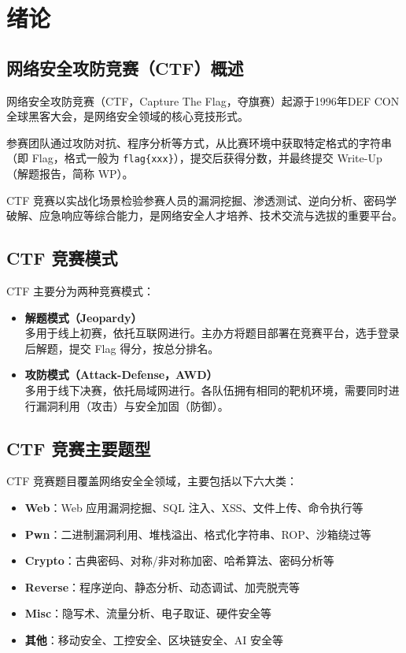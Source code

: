 \section{绪论}
\label{sec:introduction}

\subsection{网络安全攻防竞赛（CTF）概述}
网络安全攻防竞赛（CTF，Capture The Flag，夺旗赛）起源于1996年DEF CON全球黑客大会，是网络安全领域的核心竞技形式。

参赛团队通过攻防对抗、程序分析等方式，从比赛环境中获取特定格式的字符串（即 Flag，格式一般为 \verb|flag{xxx}|），提交后获得分数，并最终提交 Write-Up（解题报告，简称 WP）。

CTF 竞赛以实战化场景检验参赛人员的漏洞挖掘、渗透测试、逆向分析、密码学破解、应急响应等综合能力，是网络安全人才培养、技术交流与选拔的重要平台。

\subsection{CTF 竞赛模式}
CTF 主要分为两种竞赛模式：
\begin{itemize}[leftmargin=*]
    \item \textbf{解题模式（Jeopardy）}
    \\多用于线上初赛，依托互联网进行。主办方将题目部署在竞赛平台，选手登录后解题，提交 Flag 得分，按总分排名。

    \item \textbf{攻防模式（Attack-Defense，AWD）}
    \\多用于线下决赛，依托局域网进行。各队伍拥有相同的靶机环境，需要同时进行漏洞利用（攻击）与安全加固（防御）。
\end{itemize}

\subsection{CTF 竞赛主要题型}
CTF 竞赛题目覆盖网络安全全领域，主要包括以下六大类：
\begin{itemize}[leftmargin=*]
    \item \textbf{Web}：Web 应用漏洞挖掘、SQL 注入、XSS、文件上传、命令执行等
    \item \textbf{Pwn}：二进制漏洞利用、堆栈溢出、格式化字符串、ROP、沙箱绕过等
    \item \textbf{Crypto}：古典密码、对称/非对称加密、哈希算法、密码分析等
    \item \textbf{Reverse}：程序逆向、静态分析、动态调试、加壳脱壳等
    \item \textbf{Misc}：隐写术、流量分析、电子取证、硬件安全等
    \item \textbf{其他}：移动安全、工控安全、区块链安全、AI 安全等
\end{itemize}

